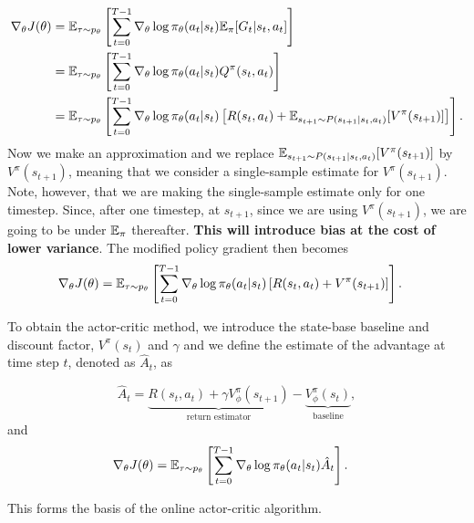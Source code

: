 \documentclass{article}
\begin{document}
\begin{align*}
    \nabla_\theta J(\theta) &= {\mathbb E}_{\tau \sim p_\theta} \left[\sum_{t=0}^{T-1} \nabla_\theta \log \pi_\theta(a_t \vert s_t) {\mathbb E}_\pi[G_t \vert s_t, a_t]\right] \\
    &= {\mathbb E}_{\tau \sim p_\theta} \left[\sum_{t=0}^{T-1} \nabla_\theta \log \pi_\theta(a_t \vert s_t) Q^\pi(s_t,a_t)\right]\\
    &= {\mathbb E}_{\tau \sim p_\theta} \left[\sum_{t=0}^{T-1} \nabla_\theta \log \pi_\theta(a_t \vert s_t) \left[R(s_t, a_t)+ {\mathbb E}_{s_{t+1}\sim P(s_{t+1}\vert s_t, a_t)}[V^\pi(s_{t+1})]\right]\right].
\end{align*}
Now we make an approximation and we replace ${\mathbb E}_{s_{t+1}\sim P(s_{t+1}\vert s_t, a_t)}[V^\pi(s_{t+1})]$ by $V^\pi(s_{t+1})$, meaning that we consider a single-sample estimate for $V^\pi(s_{t+1})$. Note, however, that we are making the single-sample estimate only for one timestep. Since, after one timestep, at $s_{t+1}$, since we are using $V^\pi(s_{t+1})$, we are going to be under ${\mathbb E}_\pi$ thereafter. \textbf{This will introduce bias at the cost of lower variance}. The modified policy gradient then becomes
\begin{align*}
    \nabla_\theta J(\theta) &= {\mathbb E}_{\tau \sim p_\theta} \left[\sum_{t=0}^{T-1} \nabla_\theta \log \pi_\theta(a_t \vert s_t) \left[R(s_t, a_t)+ V^\pi(s_{t+1})\right]\right].
\end{align*}

To obtain the actor-critic method, we introduce the state-base baseline and discount factor, $V^\pi(s_t)$ and $\gamma$ and we define the estimate of the advantage at time step $t$, denoted as $\hat{A}_t$, as

$$\hat{A}_t = \underbrace{R(s_t,a_t) + \gamma V_\phi^\pi(s_{t+1})}_{\text{return estimator}} - \underbrace{V_\phi^\pi(s_t)}_{\text{baseline}},$$
and
\begin{align*}
    \nabla_\theta J(\theta) &= {\mathbb E}_{\tau \sim p_\theta} \left[\sum_{t=0}^{T-1} \nabla_\theta \log \pi_\theta(a_t \vert s_t) \hat A_t \right].
\end{align*}

This forms the basis of the online actor-critic algorithm.
\end{document}
